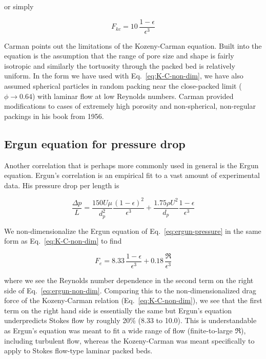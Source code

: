 or simply

\begin{equation}\label{eq:K-C-non-dim}
	F_{kc} = 10\, \frac{1-\epsilon}{\epsilon^3}
\end{equation}

Carman points out\cite{Carman1956} the limitations of the Kozeny-Carman equation. Built into the equation is the assumption that the range of pore size and shape is fairly isotropic and similarly the tortuosity through the packed bed is relatively uniform. In the form we have used with Eq.~\ref{eq:K-C-non-dim}, we have also assumed spherical particles in random packing near the close-packed limit ($\phi \rightarrow 0.64$) with laminar flow at low Reynolds numbers. Carman provided modifications to cases of extremely high porosity and non-spherical, non-regular packings in his book from 1956.\cite{Carman1956}

\subsection{Ergun equation for pressure drop}

Another correlation that is perhaps more commonly used in general is the Ergun equation.\cite{ergun1952fluid} Ergun's correlation is an empirical fit to a vast amount of experimental data. His pressure drop per length is 

\begin{equation}\label{eq:ergun-pressure}
	\frac{\Delta p}{L} = \frac{150 U \mu}{d_p^2} \frac{(1-\epsilon)^2}{\epsilon^3} + \frac{1.75 \rho U^2}{d_p}\frac{1-\epsilon}{\epsilon^3}
\end{equation}

We non-dimensionalize the Ergun equation of Eq.~\ref{eq:ergun-pressure} in the same form as Eq.~\ref{eq:K-C-non-dim} to find

\begin{equation}\label{eq:ergun-non-dim}
	F_e = 8.33 \, \frac{1-\epsilon}{\epsilon^3} + 0.18 \, \frac{\Re}{\epsilon^3}
\end{equation}

where we see the Reynolds number dependence in the second term on the right side of Eq.~\ref{eq:ergun-non-dim}. Comparing this to the non-dimensionalized drag force of the Kozeny-Carman relation (Eq.~\ref{eq:K-C-non-dim}), we see that the first term on the right hand side is essentially the same but Ergun's equation underpredicts Stokes flow by roughly 20\% (8.33 to 10.0). This is understandable as Ergun's equation was meant to fit a wide range of flow (finite-to-large $\Re$), including turbulent flow, whereas the Kozeny-Carman was meant specifically to apply to Stokes flow-type laminar packed beds.

